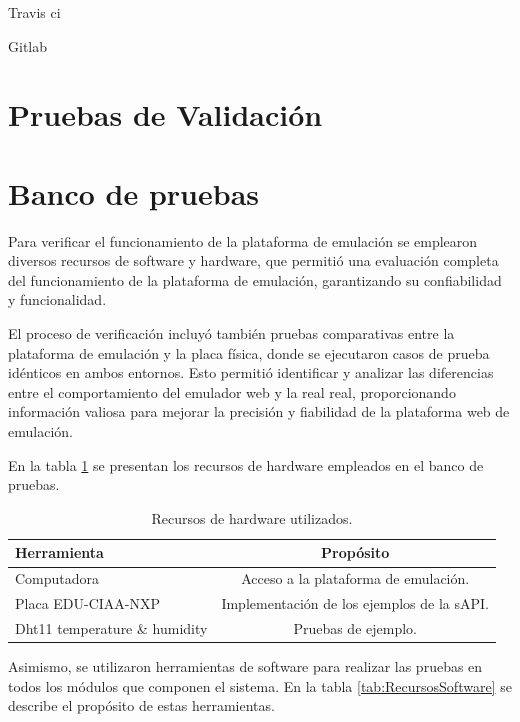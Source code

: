 Travis ci

Gitlab

\section{Pruebas de Validación}
\label{sec:Pruebas de Validación}

\section{Banco de pruebas}

Para verificar el funcionamiento de la plataforma de emulación se emplearon diversos recursos de software y hardware, que permitió una evaluación completa del funcionamiento de la plataforma de emulación, garantizando su confiabilidad y funcionalidad. 

El proceso de verificación incluyó también pruebas comparativas entre la plataforma de emulación y la placa física, donde se ejecutaron casos de prueba idénticos en ambos entornos. Esto permitió identificar y analizar las diferencias entre el comportamiento del emulador web y la real real, proporcionando información valiosa para mejorar la precisión y fiabilidad de la plataforma web de emulación.



En la tabla \ref{tab:RecursosHardware} se presentan los recursos de hardware empleados en el banco de pruebas.

\begin{table}[h]
	\centering
	\caption[Recursos de hardware utilizados]{Recursos de hardware utilizados.}
	\begin{tabular}{l c}    
		\toprule
		\textbf{Herramienta} & \textbf{Propósito}\\
		\midrule
		Computadora & Acceso a la plataforma de emulación.\\		
		Placa EDU-CIAA-NXP &  Implementación de los ejemplos de la sAPI.\\
		Dht11 temperature \& humidity  &  Pruebas de ejemplo.\\
		\bottomrule
		\hline
	\end{tabular}
	\label{tab:RecursosHardware}
\end{table}


Asimismo, se utilizaron herramientas de software para realizar las pruebas
en todos los módulos que componen el sistema. En la tabla \ref{tab:RecursosSoftware} se describe el propósito de estas herramientas.

